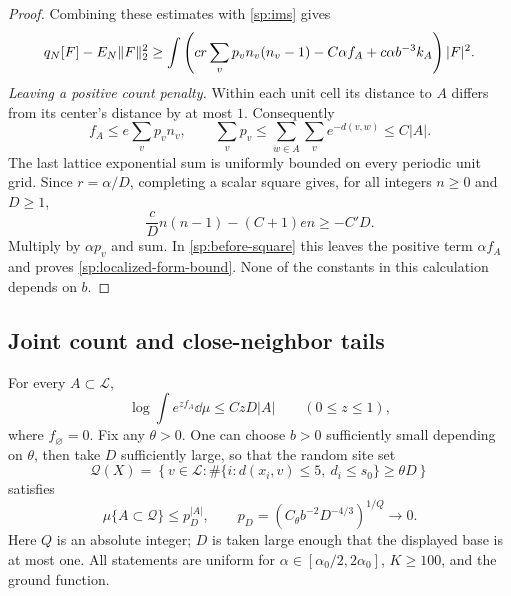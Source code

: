 \begin{proof}
Combining these estimates with \eqref{sp:ims} gives
\begin{equation}\label{sp:before-square}
 q_N[F]-E_N\lVert F\rVert_2^2
 \ge\int\left(cr\sum_vp_v n_v(n_v-1)
                 -C\alpha f_A+c\alpha b^{-3}k_A\right)|F|^2.
\end{equation}
\smallskip\noindent\emph{Leaving a positive count penalty.}
Within each unit cell its distance to $A$ differs from its center's
distance by at most $1$.  Consequently
\[
 f_A\le e\sum_vp_v n_v,
 \qquad
 \sum_vp_v\le\sum_{w\in A}\sum_v e^{-d(v,w)}\le C|A|.
\]
The last lattice exponential sum is uniformly bounded on every periodic
unit grid.  Since $r=\alpha/D$, completing a scalar square gives,
for all integers $n\ge0$ and $D\ge1$,
\[
 \frac cD n(n-1)-(C+1)e n\ge-C'D.
\]
Multiply by $\alpha p_v$ and sum.  In \eqref{sp:before-square}
this leaves the positive term $\alpha f_A$ and proves
\eqref{sp:localized-form-bound}.  None of the constants in this
calculation depends on $b$.
\end{proof}

\subsection{Joint count and close-neighbor tails}

\begin{proposition}\label{sp:joint-tails}
For every $A\subset\mathcal L$,
\begin{equation}\label{sp:count-mgf}
 \log\int e^{zf_A}\dd\mu\le CzD|A|\qquad(0\le z\le1),
\end{equation}
where $f_\varnothing=0$.
Fix any $\theta>0$.  One can choose $b>0$ sufficiently small depending
on $\theta$, then take $D$ sufficiently large, so that the random site set
\begin{equation}\label{sp:close-bad-set}
 \mathcal Q(X)=\left\{v\in\mathcal L:
       \#\{i:d(x_i,v)\le5,\ d_i\le s_0\}\ge\theta D\right\}
\end{equation}
satisfies
\begin{equation}\label{sp:close-tail}
 \mu\{A\subset\mathcal Q\}\le p_D^{|A|},\qquad
 p_D=\left(C_{\theta}b^{-2}D^{-4/3}\right)^{1/Q}\longrightarrow0.
\end{equation}
Here $Q$ is an absolute integer; $D$ is taken large enough that the
displayed base is at most one.  All statements are uniform for
$\alpha\in[\alpha_0/2,2\alpha_0]$, $K\ge100$, and the ground function.
\end{proposition}

